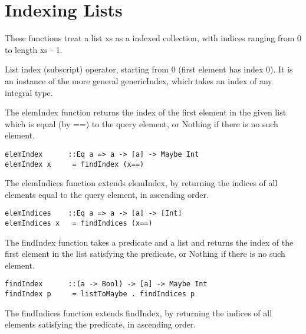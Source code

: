 \section{Indexing Lists}
These functions treat a list xs as a indexed collection, with indices ranging from 0 to length xs - 1.

List index (subscript) operator, starting from 0 (first element has index 0). It is an instance of the more general genericIndex, which takes an index of any integral type.

The elemIndex function returns the index of the first element in the given list which is equal (by ==) to the query element, or Nothing if there is no such element.
\begin{lstlisting}[frame=single]
elemIndex      ::Eq a => a -> [a] -> Maybe Int
elemIndex x     = findIndex (x==)
\end{lstlisting}

The elemIndices function extends elemIndex, by returning the indices of all elements equal to the query element, in ascending order.
\begin{lstlisting}[frame=single]
elemIndices    ::Eq a => a -> [a] -> [Int]
elemIndices x   = findIndices (x==)
\end{lstlisting}

The findIndex function takes a predicate and a list and returns the index of the first element in the list satisfying the predicate, or Nothing if there is no such element.
\begin{lstlisting}[frame=single]
findIndex      ::(a -> Bool) -> [a] -> Maybe Int
findIndex p     = listToMaybe . findIndices p
\end{lstlisting}

The findIndices function extends findIndex, by returning the indices of all elements satisfying the predicate, in ascending order.
\skipped